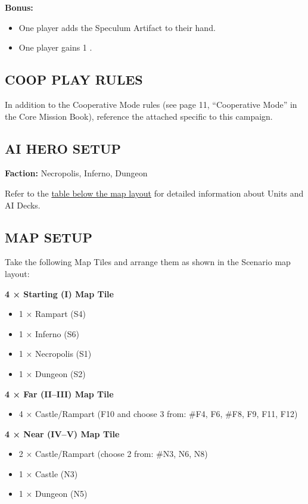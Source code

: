 \begin{multicols*}{2}
\columnbreak
\textbf{Bonus:}
\begin{itemize}
  \item One player adds the Speculum Artifact to their hand.
  \item One player gains 1 .
\end{itemize}

\subsection*{\MakeUppercase{Coop Play Rules}}

In addition to the Cooperative Mode rules (see page 11, ``Cooperative Mode'' in the Core Mission Book), reference the attached  specific to this campaign.

\subsection*{\MakeUppercase{AI Hero Setup}}

\textbf{Faction:} Necropolis, Inferno, Dungeon

Refer to the \hyperlink{Elixir of Life AI}{table below the map layout} for detailed information about Units and AI Decks.

\subsection*{\MakeUppercase{Map Setup}}

Take the following Map Tiles and arrange them as shown in the Scenario map layout:

\textbf{4 × Starting (I) Map Tile}
\begin{itemize}
  \item 1 × Rampart (S4)
  \item 1 × Inferno (S6)
  \item 1 × Necropolis (S1)
  \item 1 × Dungeon (S2)
\end{itemize}

\textbf{4 × Far (II--III) Map Tile}
\begin{itemize}
  \item 4 × Castle/Rampart (F10 and choose 3 from: \#F4, F6, \#F8, F9, F11, F12)
\end{itemize}

\textbf{4 × Near (IV--V) Map Tile}
\begin{itemize}
  \item 2 × Castle/Rampart (choose 2 from: \#N3, N6, N8)
  \item 1 × Castle (N3)
  \item 1 × Dungeon (N5)
\end{itemize}


\end{multicols*}
